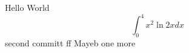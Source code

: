 \documentclass{article}
\begin{document}
Hello World
$$\int_0^4 x^2 \ln{2x}dx$$
second committ  ff
Mayeb
one more
\end{document}

